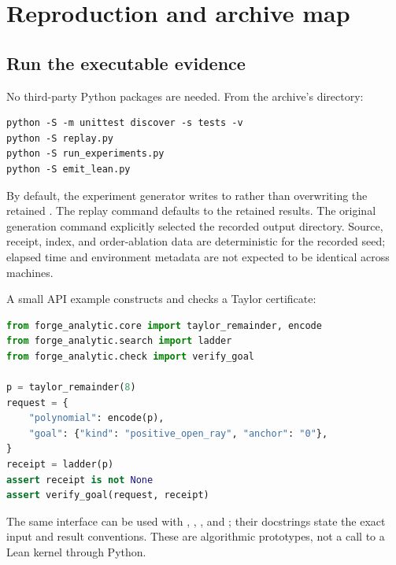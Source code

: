 \section{Reproduction and archive map}

\subsection{Run the executable evidence}

No third-party Python packages are needed. From the archive's
 directory:
\par\noindent\begin{minipage}{\linewidth}
\begin{lstlisting}
python -S -m unittest discover -s tests -v
python -S replay.py
python -S run_experiments.py
python -S emit_lean.py
\end{lstlisting}
\end{minipage}\par

By default, the experiment generator writes to  rather
than overwriting the retained . The replay command defaults to
the retained results. The original generation command explicitly selected the
recorded output directory. Source, receipt, index, and order-ablation data are
deterministic for the recorded seed; elapsed time and environment metadata are
not expected to be identical across machines.

A small API example constructs and checks a Taylor certificate:
\par\noindent\begin{minipage}{\linewidth}
\begin{lstlisting}[language=Python]
from forge_analytic.core import taylor_remainder, encode
from forge_analytic.search import ladder
from forge_analytic.check import verify_goal

p = taylor_remainder(8)
request = {
    "polynomial": encode(p),
    "goal": {"kind": "positive_open_ray", "anchor": "0"},
}
receipt = ladder(p)
assert receipt is not None
assert verify_goal(request, receipt)
\end{lstlisting}
\end{minipage}\par

The same interface can be used with , ,
, and ; their docstrings state the exact input
and result conventions. These are algorithmic prototypes, not a call to a Lean
kernel through Python.

